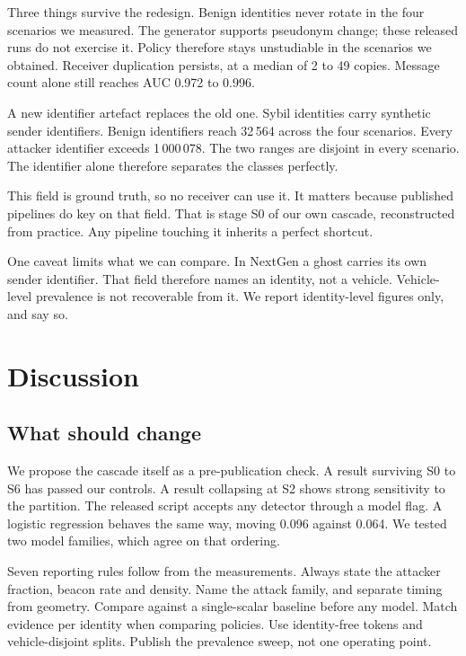 \documentclass[journal,twoside]{IEEEtran}
\begin{document}
Three things survive the redesign.
Benign identities never rotate in the four scenarios we measured.
The generator supports pseudonym change; these released runs do not exercise it.
Policy therefore stays unstudiable in the scenarios we obtained.
Receiver duplication persists, at a median of 2 to 49 copies.
Message count alone still reaches AUC 0.972 to 0.996.

A new identifier artefact replaces the old one.
Sybil identities carry synthetic sender identifiers.
Benign identifiers reach 32\,564 across the four scenarios.
Every attacker identifier exceeds 1\,000\,078.
The two ranges are disjoint in every scenario.
The identifier alone therefore separates the classes perfectly.

This field is ground truth, so no receiver can use it.
It matters because published pipelines do key on that field.
That is stage S0 of our own cascade, reconstructed from practice.
Any pipeline touching it inherits a perfect shortcut.

One caveat limits what we can compare.
In NextGen a ghost carries its own sender identifier.
That field therefore names an identity, not a vehicle.
Vehicle-level prevalence is not recoverable from it.
We report identity-level figures only, and say so.

\section{Discussion}

\subsection{What should change}

We propose the cascade itself as a pre-publication check.
A result surviving S0 to S6 has passed our controls.
A result collapsing at S2 shows strong sensitivity to the partition.
The released script accepts any detector through a model flag.
A logistic regression behaves the same way, moving 0.096 against 0.064.
We tested two model families, which agree on that ordering.

Seven reporting rules follow from the measurements.
Always state the attacker fraction, beacon rate and density.
Name the attack family, and separate timing from geometry.
Compare against a single-scalar baseline before any model.
Match evidence per identity when comparing policies.
Use identity-free tokens and vehicle-disjoint splits.
Publish the prevalence sweep, not one operating point.
\end{document}
